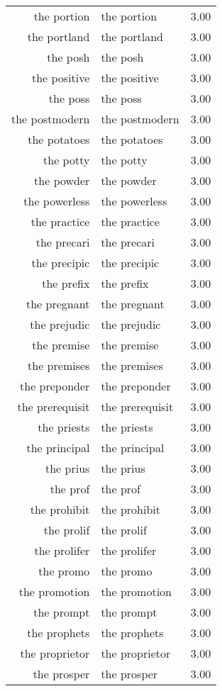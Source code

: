 \begin{table}[ht]
\begin{tabular}{rlr}
  the portion & the portion & 3.00 \\ 
  the portland & the portland & 3.00 \\ 
  the posh & the posh & 3.00 \\ 
  the positive & the positive & 3.00 \\ 
  the poss & the poss & 3.00 \\ 
  the postmodern & the postmodern & 3.00 \\ 
  the potatoes & the potatoes & 3.00 \\ 
  the potty & the potty & 3.00 \\ 
  the powder & the powder & 3.00 \\ 
  the powerless & the powerless & 3.00 \\ 
  the practice & the practice & 3.00 \\ 
  the precari & the precari & 3.00 \\ 
  the precipic & the precipic & 3.00 \\ 
  the prefix & the prefix & 3.00 \\ 
  the pregnant & the pregnant & 3.00 \\ 
  the prejudic & the prejudic & 3.00 \\ 
  the premise & the premise & 3.00 \\ 
  the premises & the premises & 3.00 \\ 
  the preponder & the preponder & 3.00 \\ 
  the prerequisit & the prerequisit & 3.00 \\ 
  the priests & the priests & 3.00 \\ 
  the principal & the principal & 3.00 \\ 
  the prius & the prius & 3.00 \\ 
  the prof & the prof & 3.00 \\ 
  the prohibit & the prohibit & 3.00 \\ 
  the prolif & the prolif & 3.00 \\ 
  the prolifer & the prolifer & 3.00 \\ 
  the promo & the promo & 3.00 \\ 
  the promotion & the promotion & 3.00 \\ 
  the prompt & the prompt & 3.00 \\ 
  the prophets & the prophets & 3.00 \\ 
  the proprietor & the proprietor & 3.00 \\ 
  the prosper & the prosper & 3.00 \\ 

\end{tabular}
\end{table}
